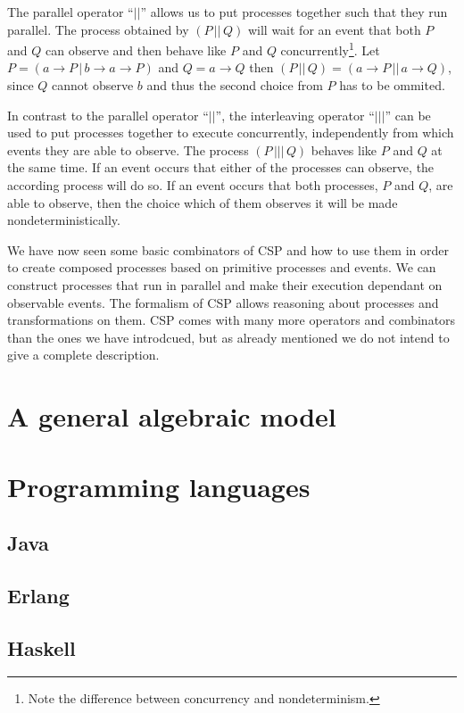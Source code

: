 The parallel operator \enquote{$||$} allows us to put processes together such that they run parallel. The process obtained by $\left( P \,||\, Q \right)$ will wait for an event that both $P$ and $Q$ can observe and then behave like $P$ and $Q$ concurrently\footnote{Note the difference between concurrency and nondeterminism.}. Let $P = \left( a \to P \,|\, b \to a \to P \right)$ and $Q = a \to Q$ then $\left( P \,||\, Q \right) = \left( a \to P \,||\, a \to Q \right)$, since $Q$ cannot observe $b$ and thus the second choice from $P$ has to be ommited.

In contrast to the parallel operator \enquote{$||$}, the interleaving operator \enquote{$|||$} can be used to put processes together to execute concurrently, independently from which events they are able to observe. The process $\left( P \,|||\, Q \right)$ behaves like $P$ and $Q$ at the same time. If an event occurs that either of the processes can observe, the according process will do so. If an event occurs that both processes, $P$ and $Q$, are able to observe, then the choice which of them observes it will be made nondeterministically.

We have now seen some basic combinators of \textsc{CSP} and how to use them in order to create composed processes based on primitive processes and events. We can construct processes that run in parallel and make their execution dependant on observable events. The formalism of \textsc{CSP} allows reasoning about processes and transformations on them. \textsc{CSP} comes with many more operators and combinators than the ones we have introdcued, but as already mentioned we do not intend to give a complete description.


\section{A general algebraic model}
\cite{Hoare:2012:LPU:2368298.2368301}

\section{Programming languages}

\subsection{Java}

\subsection{Erlang}

\subsection{Haskell}